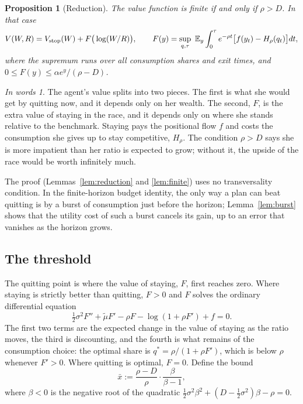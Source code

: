 \documentclass[12pt]{article}
\newtheorem{proposition}{Proposition}
\theoremstyle{definition}
\theoremstyle{remark}
\newtheorem*{inwords}{In words}
\newcommand{\E}{\mathbb{E}}
\newcommand{\mut}{\tilde\mu}
\newcommand{\OAref}[1]{\ref{#1}}
\theoremstyle{plain}
\theoremstyle{definition}
\begin{document}
\begin{proposition}[Reduction]\label{prop:reduction}
The value function is finite if and only if $\rho>D$. In that case
\[
V(W,R)=V_{\rm stop}(W)+F\big(\log(W/R)\big),\qquad F(y)=\sup_{q,\tau}\ \E_y\int_0^\tau e^{-\rho t}\big[f(y_t)-H_\rho(q_t)\big]dt,
\]
where the supremum runs over all consumption shares and exit times, and $0\le F(y)\le\alpha e^y/(\rho-D)$.
\end{proposition}

\begin{inwords}
The agent's value splits into two pieces. The first is what she would get by quitting now, and it depends only on her wealth. The second, $F$, is the extra value of staying in the race, and it depends only on where she stands relative to the benchmark. Staying pays the positional flow $f$ and costs the consumption she gives up to stay competitive, $H_\rho$. The condition $\rho>D$ says she is more impatient than her ratio is expected to grow; without it, the upside of the race would be worth infinitely much.
\end{inwords}

\noindent The proof (Lemmas~\OAref{lem:reduction} and \OAref{lem:finite}) uses no transversality condition. In the finite-horizon budget identity, the only way a plan can beat quitting is by a burst of consumption just before the horizon; Lemma~\OAref{lem:burst} shows that the utility cost of such a burst cancels its gain, up to an error that vanishes as the horizon grows.

\subsection{The threshold}

The quitting point is where the value of staying, $F$, first reaches zero. Where staying is strictly better than quitting, $F>0$ and $F$ solves the ordinary differential equation
\begin{equation}
\tfrac12\sigma^2F''+\mut F'-\rho F-\log(1+\rho F')+f=0 . \label{eq:ode}
\end{equation}
The first two terms are the expected change in the value of staying as the ratio moves, the third is discounting, and the fourth is what remains of the consumption choice: the optimal share is $q^*=\rho/(1+\rho F')$, which is below $\rho$ whenever $F'>0$. Where quitting is optimal, $F=0$. Define the bound
\[
\bar x:=\frac{\rho-D}{\rho}\cdot\frac{\beta}{\beta-1},
\]
where $\beta<0$ is the negative root of the quadratic $\tfrac12\sigma^2\beta^2+(D-\tfrac12\sigma^2)\beta-\rho=0$.
\end{document}
